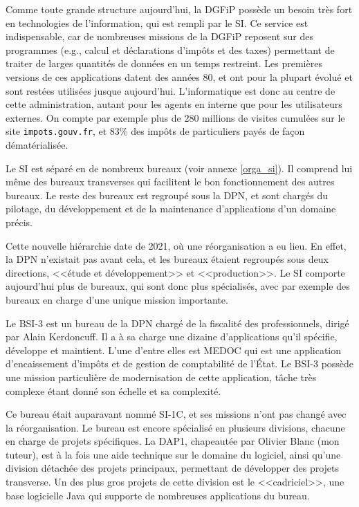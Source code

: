 \documentclass[openany, 11pt]{memoir}
\begin{document}
\bigskip
Comme toute grande structure aujourd'hui, la \gls{DGFiP} possède un besoin très fort en technologies de l'information, qui est rempli par le \gls{SI}. Ce service est indispensable, car de nombreuses missions de la DGFiP reposent sur des programmes (e.g., calcul et déclarations d'impôts et des taxes) permettant de traiter de larges quantités de données en un temps restreint. Les premières versions de ces applications datent des années 80, et ont pour la plupart évolué et sont restées utilisées jusque aujourd'hui. L'informatique est donc au centre de cette administration, autant pour les agents en interne que pour les utilisateurs externes. On compte par exemple plus de 280 millions de visites cumulées sur le site \texttt{impots.gouv.fr}, et 83\% des impôts de particuliers payés de façon dématérialisée.

Le \gls{SI} est séparé en de nombreux bureaux (voir annexe \ref{orga_si}). Il comprend lui même des bureaux \glspl{transverse} qui facilitent le bon fonctionnement des autres bureaux. Le reste des bureaux est regroupé sous la \gls{DPN}, et sont chargés du pilotage, du développement et de la maintenance d'applications d'un domaine précis.

Cette nouvelle hiérarchie date de 2021, où une réorganisation a eu lieu. En effet, la \gls{DPN} n'existait pas avant cela, et les bureaux étaient regroupés sous deux directions, <<étude et développement>> et <<production>>. Le \gls{SI} comporte aujourd'hui plus de bureaux, qui sont donc plus spécialisés, avec par exemple des bureaux en charge d'une unique mission importante.

\bigskip
Le \gls{BSI-3} est un bureau de la \gls{DPN} chargé de la fiscalité des professionnels, dirigé par Alain Kerdoncuff. Il a à sa charge une dizaine d'applications qu'il spécifie, développe et maintient. L'une d'entre elles est \gls{MEDOC} qui est une application d'encaissement d'impôts et de gestion de comptabilité de l'État. Le \gls{BSI-3} possède une mission particulière de modernisation de cette application, tâche très complexe étant donné son échelle et sa complexité.

Ce bureau était auparavant nommé SI-1C, et ses missions n'ont pas changé avec la réorganisation. Le bureau est encore spécialisé en plusieurs divisions, chacune en charge de projets spécifiques. La \gls{DAP1}, chapeautée par Olivier Blanc (mon tuteur), est à la fois une aide technique sur le domaine du logiciel, ainsi qu'une division détachée des projets principaux, permettant de développer des projets \gls{transverse}. Un des plus gros projets de cette division est le <<cadriciel>>, une base logicielle Java qui supporte de nombreuses applications du bureau.
\end{document}
